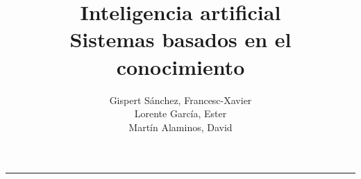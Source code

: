 \documentclass[a4paper,12pt,spanish]{article}
\begin{document}
\title{
    Inteligencia artificial\\ 
    Sistemas basados en el conocimiento
}

\author{
    Gispert Sánchez, Francesc-Xavier\\
    Lorente García, Ester\\
    Martín Alaminos, David
}

\maketitle

\noindent \rule[0.5ex]{1\columnwidth}{1pt}

\tableofcontents

\clearpage
















\end{document}
